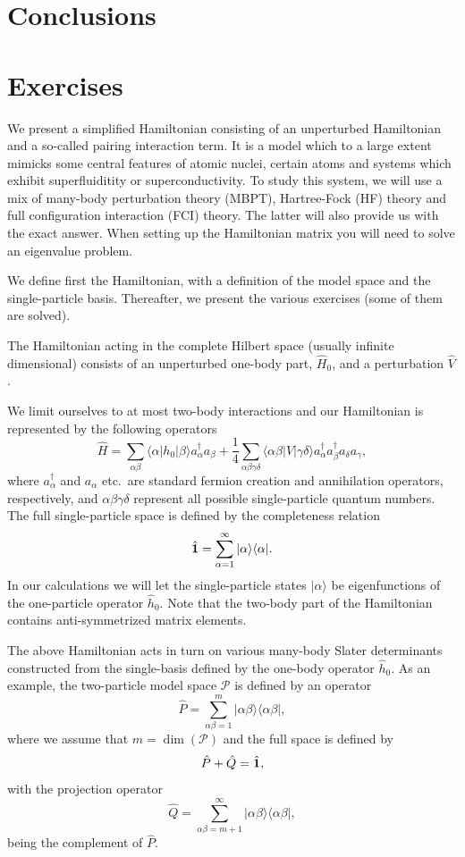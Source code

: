\section{Conclusions}


\section{Exercises}

\begin{prob}
We present a simplified Hamiltonian consisting of an unperturbed
Hamiltonian and a so-called pairing interaction term. It is a model
which to a large extent mimicks some central features of atomic
nuclei, certain atoms and systems which exhibit superfluiditity or
superconductivity.  To study this system, we will use a mix of
many-body perturbation theory (MBPT), Hartree-Fock (HF) theory and full
configuration interaction (FCI) theory. The latter will also provide us with
the exact answer.  When setting up the Hamiltonian matrix you will
need to solve an eigenvalue problem.

We define first the Hamiltonian, with a definition of the model space
and the single-particle basis. Thereafter, we present the various
exercises (some of them are solved).


The Hamiltonian acting in the complete Hilbert space (usually infinite
dimensional) consists of an unperturbed one-body part, $\hat{H}_0$,
and a perturbation $\hat{V}$.

We limit ourselves to at most two-body interactions and our Hamiltonian
is represented by the following operators
\[
\hat{H} = \sum_{\alpha\beta}\langle \alpha |h_0|\beta\rangle
a_{\alpha}^{\dagger}a_{\beta}+\frac{1}{4}\sum_{\alpha\beta\gamma\delta}\langle \alpha\beta|
V|\gamma\delta\rangle a_{\alpha}^{\dagger}a_{\beta}^{\dagger}a_{\delta}a_{\gamma},
\]
where $a_{\alpha}^{\dagger}$ and $a_{\alpha}$ etc.~are standard
fermion creation and annihilation operators, respectively, and
$\alpha\beta\gamma\delta$ represent all possible single-particle
quantum numbers.  The full single-particle space is defined by the
completeness relation
\[
\hat{{\bf 1}} = \sum_{\alpha=1}^{\infty}|\alpha \rangle \langle \alpha|.
\]
In our calculations
we will let the single-particle states $|\alpha\rangle$ be
eigenfunctions of the one-particle operator $\hat{h}_0$. Note that the two-body part of the Hamiltonian
contains anti-symmetrized matrix elements.


The above Hamiltonian acts in turn on various many-body Slater
determinants constructed from the single-basis defined by the one-body
operator $\hat{h}_0$.  As an example, the two-particle model space
$\mathcal{P}$ is defined by an operator
\[
\hat{P} = \sum_{\alpha\beta =1}^{m}|\alpha\beta \rangle \langle
\alpha\beta|,
\]
where we assume that $m=\dim(\mathcal{P})$ and the full space is
defined by
\[
\hat{P}+\hat{Q}=\hat{{\bf 1}},
\]
with the projection operator
\[
\hat{Q} = \sum_{\alpha\beta =m+1}^{\infty}|\alpha\beta \rangle \langle
\alpha\beta|,
\]
being the complement of $\hat{P}$.



\end{prob}
